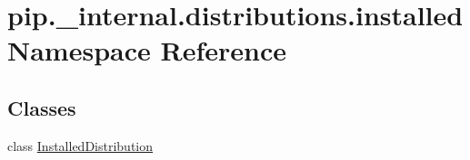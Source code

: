 \hypertarget{namespacepip_1_1__internal_1_1distributions_1_1installed}{}\section{pip.\+\_\+internal.\+distributions.\+installed Namespace Reference}
\label{namespacepip_1_1__internal_1_1distributions_1_1installed}
\subsection*{Classes}
\begin{DoxyCompactItemize}
\item 
class \hyperlink{classpip_1_1__internal_1_1distributions_1_1installed_1_1InstalledDistribution}{Installed\+Distribution}
\end{DoxyCompactItemize}
